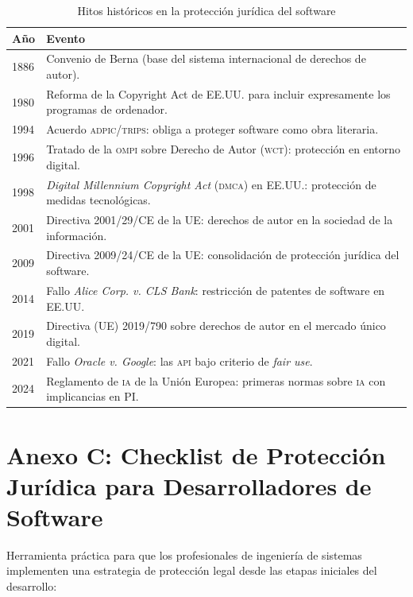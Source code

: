 \documentclass[11pt,a4paper]{report}
\begin{document}
\begin{table}[H]
\centering
\caption{Hitos históricos en la protección jurídica del software}
\label{tab:cronologia}
\begin{tabularx}{\textwidth}{@{}lX@{}}
\toprule
\textbf{Año} & \textbf{Evento} \\
\midrule
1886 & Convenio de Berna (base del sistema internacional de derechos de autor). \\
1980 & Reforma de la Copyright Act de EE.UU. para incluir expresamente los programas de ordenador. \\
1994 & Acuerdo \textsc{adpic}/\textsc{trips}: obliga a proteger software como obra literaria. \\
1996 & Tratado de la \textsc{ompi} sobre Derecho de Autor (\textsc{wct}): protección en entorno digital. \\
1998 & \textit{Digital Millennium Copyright Act} (\textsc{dmca}) en EE.UU.: protección de medidas tecnológicas. \\
2001 & Directiva 2001/29/CE de la UE: derechos de autor en la sociedad de la información. \\
2009 & Directiva 2009/24/CE de la UE: consolidación de protección jurídica del software. \\
2014 & Fallo \textit{Alice Corp. v. CLS Bank}: restricción de patentes de software en EE.UU. \\
2019 & Directiva (UE) 2019/790 sobre derechos de autor en el mercado único digital. \\
2021 & Fallo \textit{Oracle v. Google}: las \textsc{api} bajo criterio de \textit{fair use}. \\
2024 & Reglamento de \textsc{ia} de la Unión Europea: primeras normas sobre \textsc{ia} con implicancias en PI. \\
\bottomrule
\end{tabularx}
\end{table}

\vspace{0.5cm}

\section*{Anexo C: Checklist de Protección Jurídica para Desarrolladores de Software}

Herramienta práctica para que los profesionales de ingeniería de sistemas implementen una estrategia de protección legal desde las etapas iniciales del desarrollo:
\end{document}
